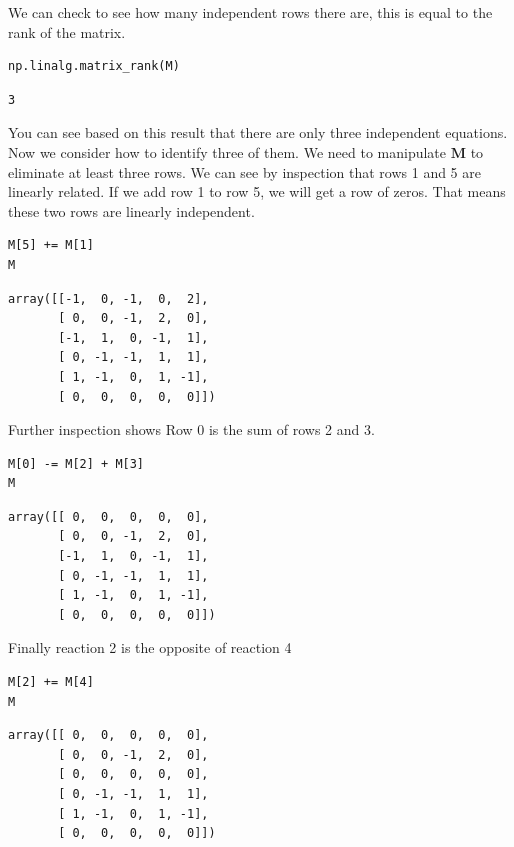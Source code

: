 \documentclass[11pt]{article}
\begin{document}
We can check to see how many independent rows there are, this is equal to the rank of the matrix.

\begin{verbatim}
np.linalg.matrix_rank(M)
\end{verbatim}

\begin{verbatim}
3
\end{verbatim}

You can see based on this result that there are only three independent equations. Now we consider how to identify three of them. We need to manipulate \(\mathbf{M}\) to eliminate at least three rows. We can see by inspection that rows 1 and 5 are linearly related. If we add row 1 to row 5, we will get a row of zeros. That means these two rows are linearly independent.

\begin{verbatim}
M[5] += M[1]
M
\end{verbatim}

\begin{verbatim}
array([[-1,  0, -1,  0,  2],
       [ 0,  0, -1,  2,  0],
       [-1,  1,  0, -1,  1],
       [ 0, -1, -1,  1,  1],
       [ 1, -1,  0,  1, -1],
       [ 0,  0,  0,  0,  0]])
\end{verbatim}

Further inspection shows Row 0 is the sum of rows 2 and 3.

\begin{verbatim}
M[0] -= M[2] + M[3]
M
\end{verbatim}

\begin{verbatim}
array([[ 0,  0,  0,  0,  0],
       [ 0,  0, -1,  2,  0],
       [-1,  1,  0, -1,  1],
       [ 0, -1, -1,  1,  1],
       [ 1, -1,  0,  1, -1],
       [ 0,  0,  0,  0,  0]])
\end{verbatim}

Finally reaction 2 is the opposite of reaction 4

\begin{verbatim}
M[2] += M[4]
M
\end{verbatim}

\begin{verbatim}
array([[ 0,  0,  0,  0,  0],
       [ 0,  0, -1,  2,  0],
       [ 0,  0,  0,  0,  0],
       [ 0, -1, -1,  1,  1],
       [ 1, -1,  0,  1, -1],
       [ 0,  0,  0,  0,  0]])
\end{verbatim}
\end{document}
